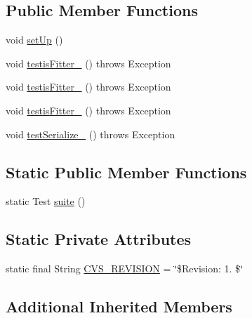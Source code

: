 \subsection*{Public Member Functions}
\begin{DoxyCompactItemize}
\item 
void \hyperlink{classorg_1_1jgap_1_1gp_1_1impl_1_1_delta_g_p_fitness_evaluator_test_a6d8d32b1c73701508f039cc8f9f6aacd}{set\-Up} ()
\item 
void \hyperlink{classorg_1_1jgap_1_1gp_1_1impl_1_1_delta_g_p_fitness_evaluator_test_a70b85ecb55bec628bb4623eaf5119b36}{testis\-Fitter\-\_} ()  throws Exception 
\item 
void \hyperlink{classorg_1_1jgap_1_1gp_1_1impl_1_1_delta_g_p_fitness_evaluator_test_a80b53dfa91d2bdb8ca59c349e731b475}{testis\-Fitter\-\_} ()  throws Exception 
\item 
void \hyperlink{classorg_1_1jgap_1_1gp_1_1impl_1_1_delta_g_p_fitness_evaluator_test_a974fb7e96444ab2a3a68757eead3d2d7}{testis\-Fitter\-\_} ()  throws Exception 
\item 
void \hyperlink{classorg_1_1jgap_1_1gp_1_1impl_1_1_delta_g_p_fitness_evaluator_test_a9fdef85b259b3964161bd3e8d31002f6}{test\-Serialize\-\_} ()  throws Exception 
\end{DoxyCompactItemize}
\subsection*{Static Public Member Functions}
\begin{DoxyCompactItemize}
\item 
static Test \hyperlink{classorg_1_1jgap_1_1gp_1_1impl_1_1_delta_g_p_fitness_evaluator_test_a4fb5f76a6001c704c026fa2c10e7f117}{suite} ()
\end{DoxyCompactItemize}
\subsection*{Static Private Attributes}
\begin{DoxyCompactItemize}
\item 
static final String \hyperlink{classorg_1_1jgap_1_1gp_1_1impl_1_1_delta_g_p_fitness_evaluator_test_ac09a2a84b8c9e1148f8f87c1f5b398c3}{C\-V\-S\-\_\-\-R\-E\-V\-I\-S\-I\-O\-N} = \char`\"{}\$Revision\-: 1. \$\char`\"{}
\end{DoxyCompactItemize}
\subsection*{Additional Inherited Members}


